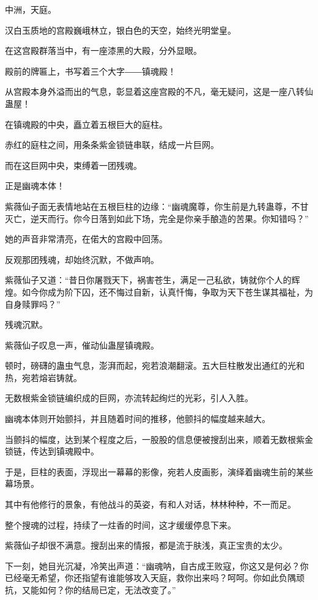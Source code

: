 
\begin{this_body}

中洲，天庭。

汉白玉质地的宫殿巍峨林立，银白色的天空，始终光明堂皇。

在这宫殿群落当中，有一座漆黑的大殿，分外显眼。

殿前的牌匾上，书写着三个大字――镇魂殿！

从宫殿本身外溢而出的气息，彰显着这座宫殿的不凡，毫无疑问，这是一座八转仙蛊屋！

在镇魂殿的中央，矗立着五根巨大的庭柱。

赤红的庭柱之间，用条条紫金锁链串联，结成一片巨网。

而在这巨网中央，束缚着一团残魂。

正是幽魂本体！

紫薇仙子面无表情地站在五根巨柱的边缘：“幽魂魔尊，你生前是九转蛊尊，不甘灭亡，逆天而行。你今日落到如此下场，完全是你亲手酿造的苦果。你知错吗？”

她的声音非常清亮，在偌大的宫殿中回荡。

反观那团残魂，却始终沉默，不做声响。

紫薇仙子又道：“昔日你屠戮天下，祸害苍生，满足一己私欲，铸就你个人的辉煌。如今你成为阶下囚，还不悔过自新，认真忏悔，争取为天下苍生谋其福祉，为自身赎罪吗？”

残魂沉默。

紫薇仙子叹息一声，催动仙蛊屋镇魂殿。

顿时，磅礴的蛊虫气息，澎湃而起，宛若浪潮翻滚。五大巨柱散发出通红的光和热，宛若熔岩铸就。

无数根紫金锁链编织成的巨网，亦流转起绚烂的光彩，引人入胜。

幽魂本体则开始颤抖，并且随着时间的推移，他颤抖的幅度越来越大。

当颤抖的幅度，达到某个程度之后，一股股的信息便被搜刮出来，顺着无数根紫金锁链，传达到镇魂殿中。

于是，巨柱的表面，浮现出一幕幕的影像，宛若人皮画影，演绎着幽魂生前的某些幕场景。

其中有他修行的景象，有他战斗的英姿，有和人对话，林林种种，不一而足。

整个搜魂的过程，持续了一炷香的时间，这才缓缓停息下来。

紫薇仙子却很不满意。搜刮出来的情报，都是流于肤浅，真正宝贵的太少。

下一刻，她目光沉凝，冷笑出声道：“幽魂呐，自古成王败寇，你这又是何必？你已经毫无希望，你还指望有谁能够攻入天庭，救你出来吗？呵呵。你如此负隅顽抗，又能如何？你的结局已定，无法改变了。”


\end{this_body}
